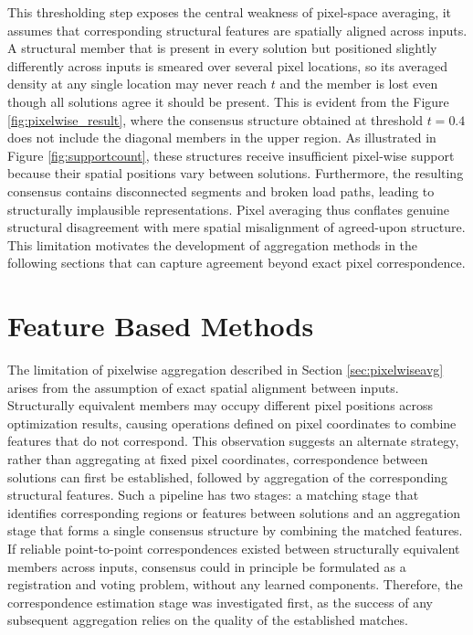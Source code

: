 \documentclass[
  numbers=noenddot,
  english,  %
  a4paper,  %
  twoside,  %
  bibliography=totoc,
  headsepline,
  cleardoublepage=empty,
  parskip=half,
  draft=false
]{scrbook}
\theoremstyle{break}
\begin{document}
This thresholding step exposes the central weakness of pixel-space averaging, it assumes that corresponding structural features are spatially aligned across inputs. A structural member that is present in every solution but positioned slightly differently across inputs is smeared over several pixel locations, so its averaged density at any single location may never reach $t$ and the member is lost even though all solutions agree it should be present. This is evident from the Figure \ref{fig:pixelwise_result}, where the consensus structure obtained at threshold $t = 0.4$ does not include the diagonal members in the upper region. As illustrated in Figure \ref{fig:supportcount}, these structures receive insufficient pixel-wise support because their spatial positions vary between solutions. Furthermore, the resulting consensus contains disconnected segments and broken load paths, leading to structurally implausible representations. Pixel averaging thus conflates genuine structural disagreement with mere spatial misalignment of agreed-upon structure. This limitation motivates the development of aggregation methods in the following sections that can capture agreement beyond exact pixel correspondence.



\section{Feature Based Methods}\label{sec:featurebased}

The limitation of pixelwise aggregation described in Section \ref{sec:pixelwiseavg} arises from the assumption of exact spatial alignment between inputs. Structurally equivalent members may occupy different pixel positions across optimization results, causing operations defined on pixel coordinates to combine features that do not correspond. This observation suggests an alternate strategy, rather than aggregating at fixed pixel coordinates, correspondence between solutions can first be established, followed by aggregation of the corresponding structural features. Such a pipeline has two stages: a matching stage that identifies corresponding regions or features between solutions and an aggregation stage that forms a single consensus structure by combining the matched features. If reliable point-to-point correspondences existed between structurally equivalent members across inputs, consensus could in principle be formulated as a registration and voting problem, without any learned components. Therefore, the correspondence estimation stage was investigated first, as the success of any subsequent aggregation relies on the quality of the established matches.
\end{document}
